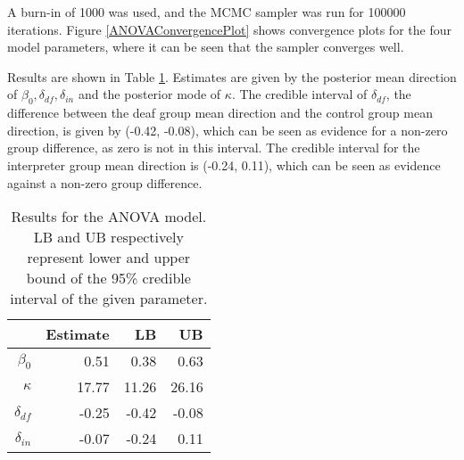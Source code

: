 \documentclass[11pt,a4paper]{article}\usepackage[]{graphicx}\usepackage[]{color}
\begin{document}
A burn-in of 1000 was used, and the MCMC sampler was run for 100000 iterations. Figure \ref{ANOVAConvergencePlot} shows convergence plots for the four model parameters, where it can be seen that the sampler converges well.

Results are shown in Table \ref{ANOVATable}. Estimates are given by the posterior mean direction of \( \beta_0, \delta_{df}, \delta_{in} \) and  the posterior mode of \( \kappa.\) The credible interval of  \( \delta_{df} \), the difference between the deaf group mean direction and the control group mean direction, is given by (-0.42, -0.08), which can be seen as evidence for a non-zero group difference, as zero is not in this interval. The credible interval for the interpreter group mean direction is (-0.24, 0.11), which can be seen as evidence against a non-zero group difference.

\begin{table}[btp]
\centering
\caption{Results for the ANOVA model. LB and UB respectively represent lower and upper bound of the 95\% credible interval of the given parameter.} 
\label{ANOVATable}
\begin{tabular}{rrrr}
  \toprule
 & Estimate & LB & UB \\ 
  \midrule
$\beta_0$ & 0.51 & 0.38 & 0.63 \\ 
  $\kappa$ & 17.77 & 11.26 & 26.16 \\ 
  $\delta_{df}$ & -0.25 & -0.42 & -0.08 \\ 
  $\delta_{in}$ & -0.07 & -0.24 & 0.11 \\ 
   \bottomrule
\end{tabular}
\end{table}
\end{document}
